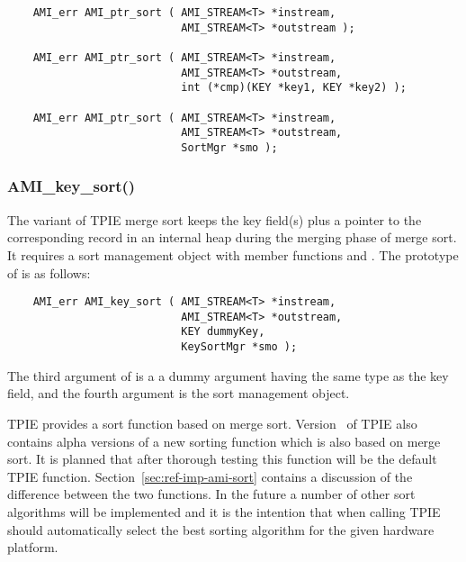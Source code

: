 \begin{verbatim}
    AMI_err AMI_ptr_sort ( AMI_STREAM<T> *instream, 
                           AMI_STREAM<T> *outstream );

    AMI_err AMI_ptr_sort ( AMI_STREAM<T> *instream, 
                           AMI_STREAM<T> *outstream, 
                           int (*cmp)(KEY *key1, KEY *key2) );

    AMI_err AMI_ptr_sort ( AMI_STREAM<T> *instream, 
                           AMI_STREAM<T> *outstream, 
                           SortMgr *smo );
\end{verbatim}


\subsubsection{AMI\_key\_sort()}

The  variant of TPIE merge sort keeps
the key field(s) plus a pointer to the corresponding record
in an internal heap during the merging phase of merge sort.
It requires a sort management object with member functions
 and . The prototype of
 is as follows:

\begin{verbatim}
    AMI_err AMI_key_sort ( AMI_STREAM<T> *instream, 
                           AMI_STREAM<T> *outstream, 
                           KEY dummyKey, 
                           KeySortMgr *smo );
\end{verbatim}

The third argument of  is a a
dummy argument having the same type as the key field, and
the fourth argument is the sort management
object.


TPIE provides a sort function  based on merge
sort. Version \version~of TPIE also contains alpha versions of a new
sorting function  which is also based on merge
sort. It is planned that after thorough testing this function will be the
default TPIE  function. Section~\ref{sec:ref-imp-ami-sort}
contains a discussion of the difference between the two functions. In the
future a number of other sort algorithms will be implemented and it is the
intention that when calling  TPIE should automatically
select the best sorting algorithm for the given hardware platform.

